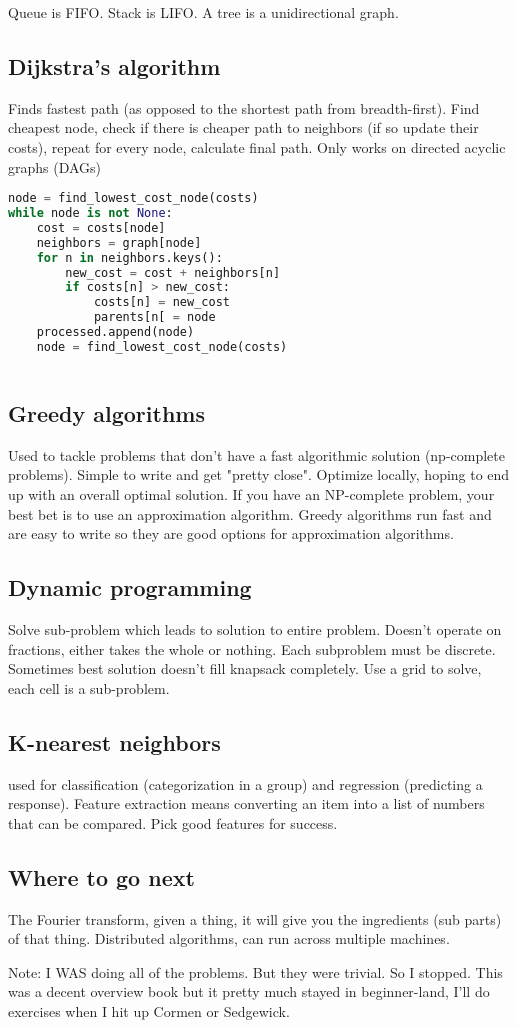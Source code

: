 Queue is FIFO. Stack is LIFO.
A tree is a unidirectional graph.

\subsection{Dijkstra's algorithm} Finds fastest path (as opposed to the shortest path from breadth-first). Find cheapest node, check if there is cheaper path to neighbors (if so update their costs), repeat for every node, calculate final path. Only works on directed acyclic graphs (DAGs)

\begin{lstlisting}[language=Python]
node = find_lowest_cost_node(costs)
while node is not None:
	cost = costs[node]
	neighbors = graph[node]
	for n in neighbors.keys():
		new_cost = cost + neighbors[n]
		if costs[n] > new_cost:
			costs[n] = new_cost
			parents[n[ = node
	processed.append(node)
	node = find_lowest_cost_node(costs)
		
\end{lstlisting}

\subsection{Greedy algorithms} Used to tackle problems that don't have a fast algorithmic solution (np-complete problems). Simple to write and get "pretty close". Optimize locally, hoping to end up with an overall optimal solution. If you have an NP-complete problem, your best bet is to use an approximation algorithm. Greedy algorithms run fast and are easy to write so they are good options for approximation algorithms.
\subsection{Dynamic programming} Solve sub-problem which leads to solution to entire problem. Doesn't operate on fractions, either takes the whole or nothing. Each subproblem must be discrete. Sometimes best solution doesn't fill knapsack completely. Use a grid to solve, each cell is a sub-problem.

\subsection{K-nearest neighbors} used for classification (categorization in a group) and regression (predicting a response). Feature extraction means converting an item into a list of numbers that can be compared. Pick good features for success.
\subsection{Where to go next} The Fourier transform, given a thing, it will give you the ingredients (sub parts) of that thing. Distributed algorithms, can run across multiple machines.

Note: I WAS doing all of the problems. But they were trivial. So I stopped. This was a decent overview book but it pretty much stayed in beginner-land, I'll do exercises when I hit up Cormen or Sedgewick.


